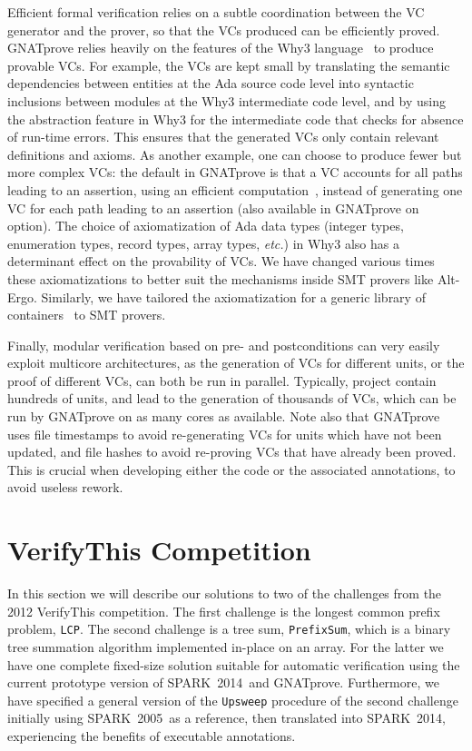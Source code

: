 \documentclass[sttt,draft]{svjour}
\newcommand{\gnatprove}{GNATprove\xspace}
\newcommand{\oldspark}{SPARK~2005\xspace}
\newcommand{\newspark}{SPARK~2014\xspace}
\newcommand{\etc}{\textit{etc.}\xspace}
\begin{document}
Efficient formal verification relies on a subtle coordination between the VC
generator and the prover, so that the VCs produced can be efficiently
proved. \gnatprove relies heavily on the features of the Why3
language~\cite{guitton2011boogie} to produce provable VCs. For example, the VCs
are kept small by translating the semantic dependencies between entities at the
Ada source code level into syntactic inclusions between modules at the Why3
intermediate code level, and by using the abstraction feature in Why3 for the
intermediate code that checks for absence of run-time errors. This ensures that
the generated VCs only contain relevant definitions and axioms. As another
example, one can choose to produce fewer but more complex VCs: the default in
\gnatprove is that a VC accounts for all paths leading to an assertion, using
an efficient computation~\cite{leino2005ipl}, instead of generating one VC for
each path leading to an assertion (also available in \gnatprove on option). The
choice of axiomatization of Ada data types (integer types, enumeration types,
record types, array types, \etc) in Why3 also has a determinant effect on the
provability of VCs. We have changed various times these axiomatizations to
better suit the mechanisms inside SMT provers like Alt-Ergo. Similarly, we have
tailored the axiomatization for a generic library of
containers~\cite{dross:2011:tap} to SMT provers.

Finally, modular verification based on pre- and postconditions can very easily
exploit multicore architectures, as the generation of VCs for different units,
or the proof of different VCs, can both be run in parallel. Typically, project
contain hundreds of units, and lead to the generation of thousands of VCs,
which can be run by \gnatprove on as many cores as available. Note also that
\gnatprove uses file timestamps to avoid re-generating VCs for units which have
not been updated, and file hashes to avoid re-proving VCs that have already
been proved. This is crucial when developing either the code or the associated
annotations, to avoid useless rework.

\section{VerifyThis Competition}
\label{verifythis}
In this section we will describe our solutions to two of the
challenges from the 2012 VerifyThis competition. The first challenge
is the longest common prefix problem, \verb|LCP|. The second challenge
is a tree sum, \verb|PrefixSum|, which is a binary tree summation
algorithm implemented in-place on an array. For the latter we have one
complete fixed-size solution suitable for automatic verification using
the current prototype version of \newspark\ and
\gnatprove. Furthermore, we have specified a general version of the
\verb|Upsweep| procedure of the second challenge initially using
\oldspark\ as a reference, then translated into \newspark,
experiencing the benefits of executable annotations.
\end{document}
